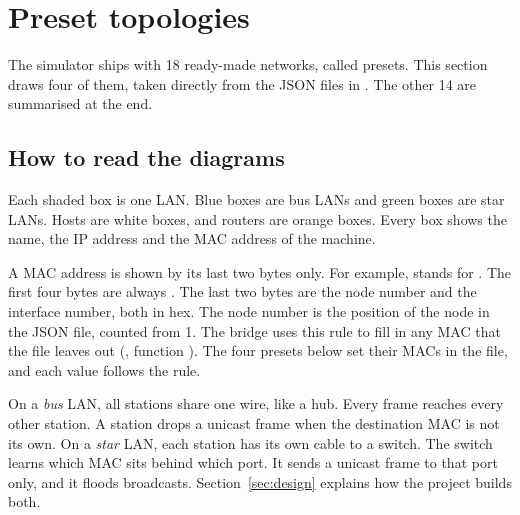 \section{Preset topologies}\label{sec:topologies}
The simulator ships with 18 ready-made networks, called presets. This section draws four of them, taken directly from the JSON files in . The other 14 are summarised at the end.


\subsection{How to read the diagrams}
Each shaded box is one LAN. Blue boxes are bus LANs and green boxes are star LANs. Hosts are white boxes, and routers are orange boxes. Every box shows the name, the IP address and the MAC address of the machine.

A MAC address is shown by its last two bytes only. For example,  stands for . The first four bytes are always . The last two bytes are the node number and the interface number, both in hex. The node number is the position of the node in the JSON file, counted from 1. The bridge uses this rule to fill in any MAC that the file leaves out (, function ). The four presets below set their MACs in the file, and each value follows the rule.

On a \emph{bus} LAN, all stations share one wire, like a hub. Every frame reaches every other station. A station drops a unicast frame when the destination MAC is not its own. On a \emph{star} LAN, each station has its own cable to a switch. The switch learns which MAC sits behind which port. It sends a unicast frame to that port only, and it floods broadcasts. Section~\ref{sec:design} explains how the project builds both.

